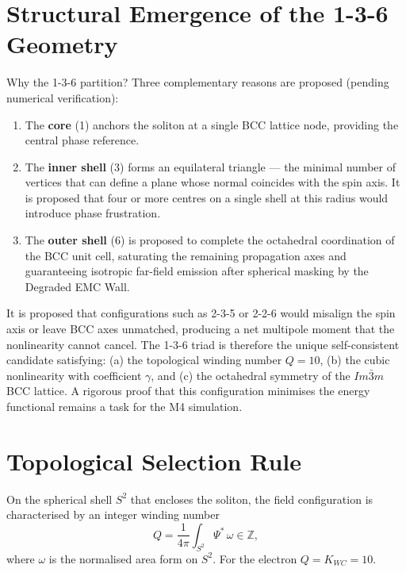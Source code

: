 \documentclass[11pt,a4paper]{article}
\begin{document}
	\section{Structural Emergence of the 1-3-6 Geometry}
	
	Why the 1-3-6 partition?  Three complementary reasons are proposed
	(pending numerical verification):
	
	\begin{enumerate}
		\item The \textbf{core} (1) anchors the soliton at a single BCC lattice
		node, providing the central phase reference.
		\item The \textbf{inner shell} (3) forms an equilateral triangle ---
		the minimal number of vertices that can define a plane whose
		normal coincides with the spin axis.  It is proposed that four
		or more centres on a single shell at this radius would introduce
		phase frustration.
		\item The \textbf{outer shell} (6) is proposed to complete the
		octahedral coordination of the BCC unit cell, saturating the
		remaining propagation axes and guaranteeing isotropic far-field
		emission after spherical masking by the Degraded EMC Wall.
	\end{enumerate}
	
	It is proposed that configurations such as 2-3-5 or 2-2-6 would
	misalign the spin axis or leave BCC axes unmatched, producing a net
	multipole moment that the nonlinearity cannot cancel.  The 1-3-6
	triad is therefore the unique self-consistent candidate satisfying:
	(a) the topological winding number $Q=10$,
	(b) the cubic nonlinearity with coefficient $\gamma$, and
	(c) the octahedral symmetry of the $Im\bar{3}m$ BCC lattice.
	A rigorous proof that this configuration minimises the energy
	functional remains a task for the M4 simulation.
	
	\section{Topological Selection Rule}
	
	On the spherical shell $S^{2}$ that encloses the soliton, the field
	configuration is characterised by an integer winding number
	\begin{equation}\label{eq:Q}
		Q = \frac{1}{4\pi} \int_{S^{2}} \Psi^{*}\,\omega \in \mathbb{Z},
	\end{equation}
	where $\omega$ is the normalised area form on $S^{2}$.  For the electron
	$Q = K_{WC} = 10$.
	
\end{document}
